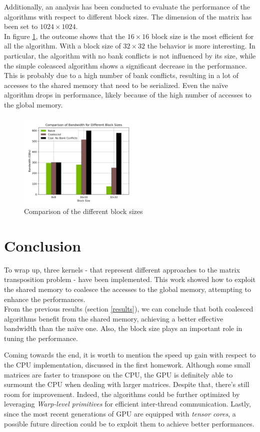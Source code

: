 \documentclass{IEEEconf}
\begin{document}
Additionally, an analysis has been conducted to evaluate the performance of the algorithms with respect to different block sizes.
The dimension of the matrix has been set to $1024 \times 1024$.\\
In figure \ref{fig:tile_comparison}, the outcome shows that the $16 \times 16$ block size is the most efficient for all the algorithm.
With a block size of $32 \times 32$ the behavior is more interesting.
In particular, the algorithm with no bank conflicts is not influenced by its size, while the simple coleasced algorithm shows a 
significant decrease in the performance. This is probably due to a high number of bank conflicts, resulting in a lot of accesses to the 
shared memory that need to be serialized. Even the na\"{i}ve algorithm drops in performance, likely because of the high number of accesses
to the global memory.
\begin{figure}
    \centering
    \includegraphics[width=0.55\textwidth]{report/img/tile_comparison.png}
    \caption{Comparison of the different block sizes}
    \label{fig:tile_comparison}
\end{figure}
\section{Conclusion}
To wrap up, three kernels - that represent different approaches to the matrix transposition problem - have been implemented.
This work showed how to exploit the shared memory to coalesce the accesses to the global memory, attempting to enhance the performances.\\
From the previous results (section \ref{results}), we can conclude that both coalesced algorithms benefit from the shared memory, achieving a 
better effective bandwidth than the na\"{i}ve one. Also, the block size plays an important role in tuning the performance.

Coming towards the end, it is worth to mention the speed up gain with respect to the CPU implementation, discussed in the first homework. Although some small matrices are faster to transpose
on the CPU, the GPU is definitely able to surmount the CPU when dealing with larger matrices.
Despite that, there's still room for improvement. Indeed, the algorithms could be further optimized by leveraging
\textit{Warp-level primitives} for efficient inter-thread communication.
Lastly, since the most recent generations of GPU are equipped with \textit{tensor cores}, a possible future direction could be to exploit 
them to achieve better performances.
\clearpage


\end{document}
